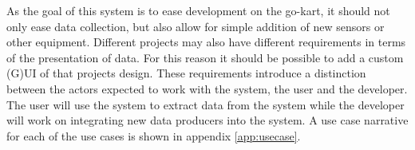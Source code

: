 As the goal of this system is to ease development on the go-kart, it should not only ease data collection, but also allow for simple addition of new sensors or other equipment.
Different projects may also have different requirements in terms of the presentation of data.
For this reason it should be possible to add a custom (G)UI of that projects design.
These requirements introduce a distinction between the actors expected to work with the system, the user and the developer.
The user will use the system to extract data from the system while the developer will work on integrating new data producers into the system.
A use case narrative for each of the use cases is shown in appendix \ref{app:usecase}.